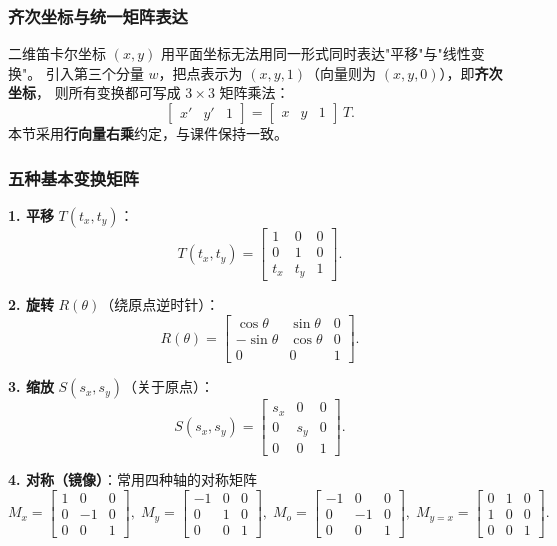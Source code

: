 \documentclass[a4paper,12pt]{ctexart}
\begin{document}
\subsubsection{齐次坐标与统一矩阵表达}

二维笛卡尔坐标 $(x,y)$ 用平面坐标无法用同一形式同时表达"平移"与"线性变换"。
引入第三个分量 $w$，把点表示为 $(x,y,1)$（向量则为 $(x,y,0)$），即\textbf{齐次坐标}，
则所有变换都可写成 $3\times 3$ 矩阵乘法：
\[
    \begin{bmatrix} x' & y' & 1 \end{bmatrix}
    =
    \begin{bmatrix} x & y & 1 \end{bmatrix}\,T .
\]
本节采用\textbf{行向量右乘}约定，与课件保持一致。

\subsubsection{五种基本变换矩阵}

\textbf{1. 平移} $T(t_x,t_y)$：
\[
    T(t_x,t_y) =
    \begin{bmatrix}
        1 & 0 & 0 \\
        0 & 1 & 0 \\
        t_x & t_y & 1
    \end{bmatrix}.
\]

\textbf{2. 旋转} $R(\theta)$（绕原点逆时针）：
\[
    R(\theta) =
    \begin{bmatrix}
        \cos\theta & \sin\theta & 0 \\
       -\sin\theta & \cos\theta & 0 \\
        0          & 0          & 1
    \end{bmatrix}.
\]

\textbf{3. 缩放} $S(s_x,s_y)$（关于原点）：
\[
    S(s_x,s_y) =
    \begin{bmatrix}
        s_x & 0   & 0 \\
        0   & s_y & 0 \\
        0   & 0   & 1
    \end{bmatrix}.
\]

\textbf{4. 对称（镜像）}：常用四种轴的对称矩阵
\[
    M_x =
    \begin{bmatrix}1&0&0\\0&-1&0\\0&0&1\end{bmatrix},\;
    M_y =
    \begin{bmatrix}-1&0&0\\0&1&0\\0&0&1\end{bmatrix},\;
    M_o =
    \begin{bmatrix}-1&0&0\\0&-1&0\\0&0&1\end{bmatrix},\;
    M_{y=x} =
    \begin{bmatrix}0&1&0\\1&0&0\\0&0&1\end{bmatrix}.
\]
\end{document}
